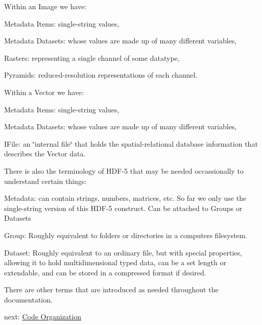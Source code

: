 Within an Image we have\+: \begin{DoxyItemize}
\item Metadata Items\+: single-\/string values, \item Metadata Datasets\+: whose values are made up of many different variables, \item Rasters\+: representing a single channel of some datatype, \item Pyramids\+: reduced-\/resolution representations of each channel.\end{DoxyItemize}
Within a Vector we have\+: \begin{DoxyItemize}
\item Metadata Items\+: single-\/string values, \item Metadata Datasets\+: whose values are made up of many different variables, \item I\+File\+: an \char`\"{}internal file\char`\"{} that holds the spatial-\/relational database information that describes the Vector data.\end{DoxyItemize}
There is also the terminology of H\+D\+F-\/5 that may be needed occassionally to understand certain things\+: \begin{DoxyItemize}
\item Metadata\+: can contain strings, numbers, matrices, etc. So far we only use the single-\/string version of this H\+D\+F-\/5 construct. Can be attached to Groups or Datasets \item Group\+: Roughly equivalent to folders or directories in a computer\textquotesingle{}s filesystem. \item Dataset\+: Roughly equivalent to an ordinary file, but with special properties, allowing it to hold multidimensional typed data, can be a set length or extendable, and can be stored in a compressed format if desired.\end{DoxyItemize}
There are other terms that are introduced as needed throughout the documentation.

next\+: \hyperlink{code_organization}{Code Organization} 